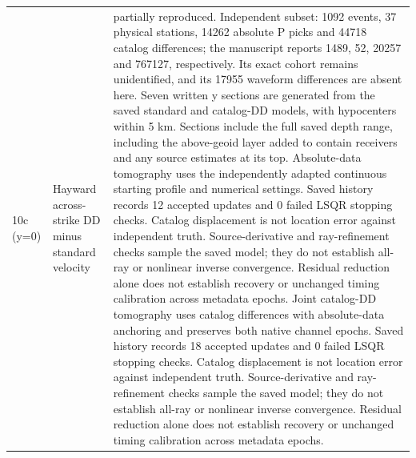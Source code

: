\begin{longtable}{>{\raggedright\arraybackslash}p{}>{\raggedright\arraybackslash}p{}>{\raggedright\arraybackslash}p{}}
10c (y=0) & Hayward across-strike DD minus standard velocity & partially reproduced. Independent subset: 1092 events, 37 physical stations, 14262 absolute P picks and 44718 catalog differences; the manuscript reports 1489, 52, 20257 and 767127, respectively. Its exact cohort remains unidentified, and its 17955 waveform differences are absent here. Seven written y sections are generated from the saved standard and catalog-DD models, with hypocenters within 5 km. Sections include the full saved depth range, including the above-geoid layer added to contain receivers and any source estimates at its top. Absolute-data tomography uses the independently adapted continuous starting profile and numerical settings. Saved history records 12 accepted updates and 0 failed LSQR stopping checks. Catalog displacement is not location error against independent truth. Source-derivative and ray-refinement checks sample the saved model; they do not establish all-ray or nonlinear inverse convergence. Residual reduction alone does not establish recovery or unchanged timing calibration across metadata epochs. Joint catalog-DD tomography uses catalog differences with absolute-data anchoring and preserves both native channel epochs. Saved history records 18 accepted updates and 0 failed LSQR stopping checks. Catalog displacement is not location error against independent truth. Source-derivative and ray-refinement checks sample the saved model; they do not establish all-ray or nonlinear inverse convergence. Residual reduction alone does not establish recovery or unchanged timing calibration across metadata epochs.\\

\end{longtable}
